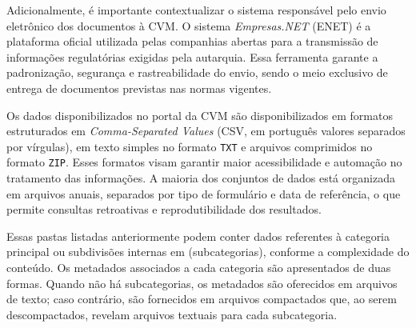Adicionalmente, é importante contextualizar o sistema responsável pelo envio eletrônico dos documentos à CVM. O sistema \textit{Empresas.NET} (ENET) é a plataforma oficial utilizada pelas companhias abertas para a transmissão de informações regulatórias exigidas pela autarquia. Essa ferramenta garante a padronização, segurança e rastreabilidade do envio, sendo o meio exclusivo de entrega de documentos previstas nas normas vigentes.

Os dados disponibilizados no portal da CVM são disponibilizados em formatos estruturados em \textit{Comma-Separated Values} (CSV, em português valores separados por vírgulas), em texto simples no formato \texttt{TXT} e arquivos comprimidos no formato \texttt{ZIP}. Esses formatos visam garantir maior acessibilidade e automação no tratamento das informações. A maioria dos conjuntos de dados está organizada em arquivos anuais, separados por tipo de formulário e data de referência, o que permite consultas retroativas e reprodutibilidade dos resultados.

Essas pastas listadas anteriormente podem conter dados referentes à categoria principal ou subdivisões internas em (subcategorias), conforme a complexidade do conteúdo. Os metadados associados a cada categoria são apresentados de duas formas. Quando não há subcategorias, os metadados são oferecidos em arquivos de texto; caso contrário, são fornecidos em arquivos compactados que, ao serem descompactados, revelam arquivos textuais para cada subcategoria.

%
%


